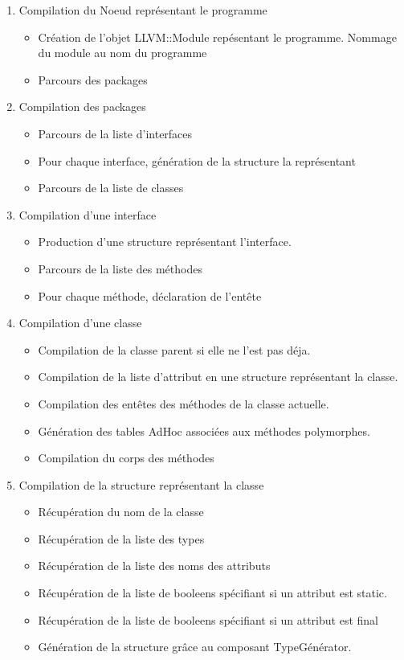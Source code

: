 \documentclass{article}
\begin{document}
\begin{enumerate}
  \item Compilation du Noeud représentant le programme
  \begin{itemize}
    \item Création de l'objet LLVM::Module repésentant le programme. Nommage du module au nom du programme
    \item Parcours des packages
  \end{itemize}

  \item Compilation des packages
  \begin{itemize}
    \item Parcours de la liste d'interfaces
    \item Pour chaque interface, génération de la structure la représentant
    \item Parcours de la liste de classes
    \end{itemize}

  \item Compilation d'une interface
  \begin{itemize}
    \item Production d'une structure représentant l'interface.
    \item Parcours de la liste des méthodes
    \item Pour chaque méthode, déclaration de l'entête
  \end{itemize}

  \item Compilation d'une classe
  \begin{itemize}  
    \item Compilation de la classe parent si elle ne l'est pas déja.
    \item Compilation de la liste d'attribut en une structure représentant la classe.
    \item Compilation des entêtes des méthodes de la classe actuelle.
    \item Génération des tables AdHoc associées aux méthodes polymorphes.
    \item Compilation du corps des méthodes
  \end{itemize}

  \item Compilation de la structure représentant la classe
   \begin{itemize}
    \item Récupération du nom de la classe
    \item Récupération de la liste des types
    \item Récupération de la liste des noms des attributs
    \item Récupération de la liste de booleens spécifiant si un attribut est static.
    \item Récupération de la liste de booleens spécifiant si un attribut est final
    \item Génération de la structure grâce au composant TypeGénérator.
   \end{itemize}


\end{enumerate}
\end{document}
